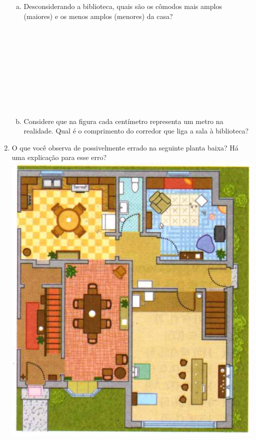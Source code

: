 \documentclass[a4paper,14pt]{article}
\begin{document}
\begin{multicols}{2}
\begin{enumerate}
			\begin{enumerate}[a)]
				\item Desconsiderando a biblioteca, quais são os cômodos mais amplos (maiores) e os menos amplos (menores) da casa? \\\\\\\\\\\\\\\\\\\\
				\item Considere que na figura cada centímetro representa um metro na realidade. Qual é o comprimento do corredor que liga a sala à biblioteca? \newpage
			\end{enumerate}
			\item O que você observa de possivelmente errado na seguinte planta baixa? Há uma explicação para esse erro? \\
			\includegraphics[width=1.1\linewidth]{6FMA30_imagens/imagem3} 

\end{enumerate}
\end{multicols}
\end{document}
